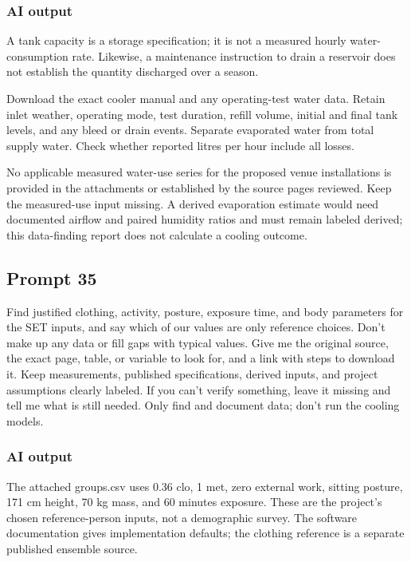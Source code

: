 \subsubsection*{AI output}
A tank capacity is a storage specification; it is not a measured hourly water-consumption rate. Likewise, a maintenance instruction to drain a reservoir does not establish the quantity discharged over a season.

Download the exact cooler manual and any operating-test water data. Retain inlet weather, operating mode, test duration, refill volume, initial and final tank levels, and any bleed or drain events. Separate evaporated water from total supply water. Check whether reported litres per hour include all losses.

No applicable measured water-use series for the proposed venue installations is provided in the attachments or established by the source pages reviewed. Keep the measured-use input missing. A derived evaporation estimate would need documented airflow and paired humidity ratios and must remain labeled derived; this data-finding report does not calculate a cooling outcome.

\subsection*{Prompt 35}
Find justified clothing, activity, posture, exposure time, and body parameters for the SET inputs, and say which of our values are only reference choices. Don’t make up any data or fill gaps with typical values. Give me the original source, the exact page, table, or variable to look for, and a link with steps to download it. Keep measurements, published specifications, derived inputs, and project assumptions clearly labeled. If you can’t verify something, leave it missing and tell me what is still needed. Only find and document data; don’t run the cooling models.

\subsubsection*{AI output}
The attached groups.csv uses 0.36 clo, 1 met, zero external work, sitting posture, 171 cm height, 70 kg mass, and 60 minutes exposure. These are the project’s chosen reference-person inputs, not a demographic survey. The software documentation gives implementation defaults; the clothing reference is a separate published ensemble source.

